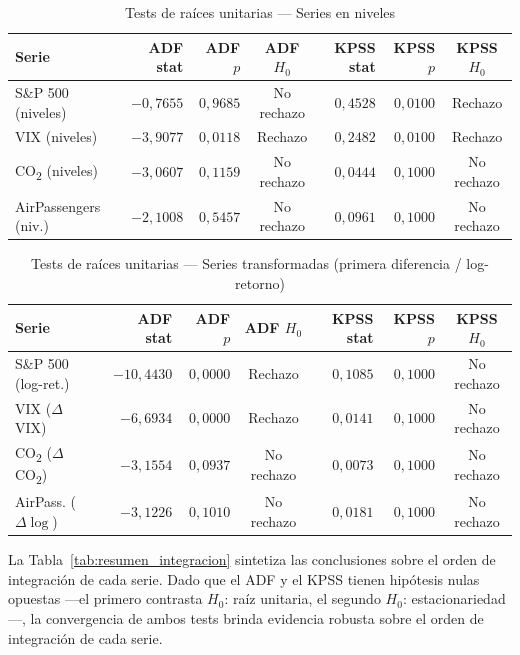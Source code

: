 \documentclass[12pt, a4paper]{article}
\begin{document}
\begin{table}[H]
    \centering
    \caption{Tests de raíces unitarias — Series en niveles}
    \label{tab:raices_niveles}
    \begin{tabular}{lrrcrrc}
        \toprule
        \textbf{Serie} & \textbf{ADF stat} & \textbf{ADF $p$} & \textbf{ADF $H_0$} & \textbf{KPSS stat} & \textbf{KPSS $p$} & \textbf{KPSS $H_0$} \\
        \midrule
        S\&P 500 (niveles)   & $-0{,}7655$ & $0{,}9685$ & No rechazo      & $0{,}4528$ & $0{,}0100$ & Rechazo \\
        VIX (niveles)        & $-3{,}9077$ & $0{,}0118$ & Rechazo         & $0{,}2482$ & $0{,}0100$ & Rechazo \\
        CO\textsubscript{2} (niveles) & $-3{,}0607$ & $0{,}1159$ & No rechazo & $0{,}0444$ & $0{,}1000$ & No rechazo \\
        AirPassengers (niv.) & $-2{,}1008$ & $0{,}5457$ & No rechazo      & $0{,}0961$ & $0{,}1000$ & No rechazo \\
        \bottomrule
    \end{tabular}
\end{table}

\begin{table}[H]
    \centering
    \caption{Tests de raíces unitarias — Series transformadas (primera diferencia / log-retorno)}
    \label{tab:raices_transf}
    \begin{tabular}{lrrcrrc}
        \toprule
        \textbf{Serie} & \textbf{ADF stat} & \textbf{ADF $p$} & \textbf{ADF $H_0$} & \textbf{KPSS stat} & \textbf{KPSS $p$} & \textbf{KPSS $H_0$} \\
        \midrule
        S\&P 500 (log-ret.)  & $-10{,}4430$ & $0{,}0000$ & Rechazo    & $0{,}1085$ & $0{,}1000$ & No rechazo \\
        VIX ($\Delta$ VIX)   & $-6{,}6934$  & $0{,}0000$ & Rechazo    & $0{,}0141$ & $0{,}1000$ & No rechazo \\
        CO\textsubscript{2} ($\Delta$ CO\textsubscript{2}) & $-3{,}1554$ & $0{,}0937$ & No rechazo & $0{,}0073$ & $0{,}1000$ & No rechazo \\
        AirPass. ($\Delta\log$) & $-3{,}1226$ & $0{,}1010$ & No rechazo & $0{,}0181$ & $0{,}1000$ & No rechazo \\
        \bottomrule
    \end{tabular}
\end{table}

La Tabla~\ref{tab:resumen_integracion} sintetiza las conclusiones sobre el orden de integración de cada serie. Dado que el ADF y el KPSS tienen hipótesis nulas opuestas ---el primero contrasta $H_0$: raíz unitaria, el segundo $H_0$: estacionariedad---, la convergencia de ambos tests brinda evidencia robusta sobre el orden de integración de cada serie.
\end{document}
